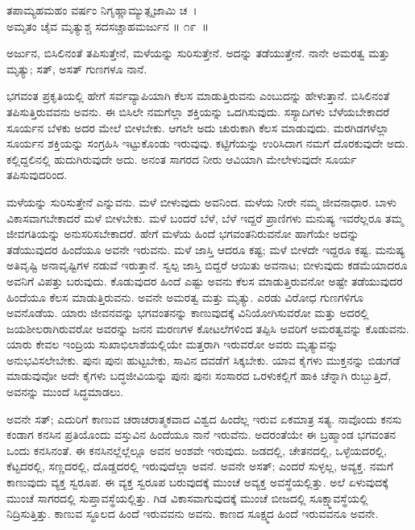 \begin{shloka}
ತಪಾಮ್ಯಹಮಹಂ ವರ್ಷಂ ನಿಗೃಹ್ಣಾಮ್ಯುತ್ಸೃಜಾಮಿ ಚ~।\\ಅಮೃತಂ ಚೈವ ಮೃತ್ಯುಶ್ಚ ಸದಸಚ್ಚಾಹಮರ್ಜುನ \hfill॥ ೧೯~॥
\end{shloka}

\begin{artha}
ಅರ್ಜುನ, ಬಿಸಿಲಿನಂತೆ ತಪಿಸುತ್ತೇನೆ, ಮಳೆಯನ್ನು ಸುರಿಸುತ್ತೇನೆ. ಅದನ್ನು ತಡೆಯುತ್ತೇನೆ. ನಾನೇ ಅಮರತ್ವ ಮತ್ತು ಮೃತ್ಯು; ಸತ್, ಅಸತ್ ಗುಣಗಳೂ ನಾನೆ.
\end{artha}

ಭಗವಂತ ಪ್ರಕೃತಿಯಲ್ಲಿ ಹೇಗೆ ಸರ್ವವ್ಯಾಪಿಯಾಗಿ ಕೆಲಸ ಮಾಡುತ್ತಿರುವನು ಎಂಬುದನ್ನು ಹೇಳುತ್ತಾನೆ. ಬಿಸಿಲಿನಂತೆ ತಪಿಸುತ್ತಿರುವವನು ಅವನು. ಈ ಬಿಸಿಲೇ ನಮಗೆಲ್ಲಾ ಶಕ್ತಿಯನ್ನು ಒದಗಿಸುವುದು. ಸಸ್ಯಾದಿಗಳು ಬೆಳೆಯಬೇಕಾದರೆ ಸೂರ್ಯನ ಬೆಳಕು ಅದರ ಮೇಲೆ ಬೀಳಬೇಕು. ಆಗಲೇ ಅದು ಚುರುಕಾಗಿ ಕೆಲಸ ಮಾಡುವುದು. ಮರಗಿಡಗಳೆಲ್ಲಾ ಸೂರ್ಯನ ಶಕ್ತಿಯನ್ನು ಸಂಗ್ರಹಿಸಿ ಇಟ್ಟುಕೊಂಡು ಇರುವುವು. ಕಟ್ಟಿಗೆಯನ್ನು ಉರಿಸಿದಾಗ ನಮಗೆ ದೊರಕುವುದೇ ಅದು. ಕಲ್ಲಿದ್ದಲಿನಲ್ಲಿ ಹುದುಗಿರುವುದೇ ಅದು. ಅನಂತ ಸಾಗರದ ನೀರು ಆವಿಯಾಗಿ ಮೇಲೇಳುವುದೇ ಸೂರ್ಯ ತಪಿಸುವುದರಿಂದ.

ಮಳೆಯನ್ನು ಸುರಿಸುತ್ತೇನೆ ಎನ್ನುವನು. ಮಳೆ ಬೀಳುವುದು ಅವನಿಂದ. ಮಳೆಯ ನೀರೇ ನಮ್ಮ ಜೀವನಾಧಾರ. ಬಾಳು ವಿಕಾಸವಾಗಬೇಕಾದರೆ ಮಳೆ ಬೀಳಬೇಕು. ಮಳೆ ಬಂದರೆ ಬೆಳೆ, ಬೆಳೆ ಇದ್ದರೆ ಪ್ರಾಣಿಗಳು ಮನುಷ್ಯ ಇವರೆಲ್ಲರೂ ತಮ್ಮ ಜೀವಗತಿಯನ್ನು ಅನುಸರಿಸಬೇಕಾದರೆ. ಹೇಗೆ ಮಳೆಯ ಹಿಂದೆ ಭಗವಂತನಿರುವನೋ ಹಾಗೆಯೇ ಅದನ್ನು ತಡೆಯುವುದರ ಹಿಂದೆಯೂ ಅವನೇ ಇರುವನು. ಮಳೆ ಜಾಸ್ತಿ ಆದರೂ ಕಷ್ಟ; ಮಳೆ ಬೀಳದೇ ಇದ್ದರೂ ಕಷ್ಟ. ಮನುಷ್ಯ ಅತಿವೃಷ್ಟಿ ಅನಾವೃಷ್ಟಿಗಳ ನಡುವೆ ಇರುತ್ತಾನೆ. ಸ್ವಲ್ಪ ಜಾಸ್ತಿ ಬಿದ್ದರೆ ಆಯಿತು ಅವನಾಟ; ಬೀಳುವುದು ಕಡಮೆಯಾದರೂ ಅವನಿಗೆ ವಿಪತ್ತು ಬರುವುದು. ಕೊಡುವುದರ ಹಿಂದೆ ಎಷ್ಟು ಅವನು ಕೆಲಸ ಮಾಡುತ್ತಿರುವನೋ ಅಷ್ಟೇ ತಡೆಯುವುದರ ಹಿಂದೆಯೂ ಕೆಲಸ ಮಾಡುತ್ತಿರುವನು. ಅವನೇ ಅಮರತ್ವ ಮತ್ತು ಮೃತ್ಯು. ಎರಡು ವಿರೋಧ ಗುಣಗಳಿಗೂ ಅವನೊಡೆಯ. ಯಾರು ಜೀವನವನ್ನು ಭಗವಂತನನ್ನು ಕಾಣುವುದಕ್ಕೆ ವಿನಿಯೋಗಿಸುವರೋ ಮತ್ತು ಅದರಲ್ಲಿ ಜಯಶೀಲರಾಗಿರು\-ವರೋ ಅವರನ್ನು ಜನನ ಮರಣಗಳ ಕೋಟಲೆಗಳಿಂದ ತಪ್ಪಿಸಿ ಅವರಿಗೆ ಅಮರತ್ವವನ್ನು ಕೊಡುವನು. ಯಾರು ಕೇವಲ ಇಂದ್ರಿಯ ಸುಖಾಭಿಲಾಶೆಯಲ್ಲಿಯೇ ಮತ್ತರಾಗಿ ಇರುವರೋ ಅವರು ಮೃತ್ಯುವನ್ನು ಅನುಭವಿಸಲೇಬೇಕು. ಪುನಃ ಪುನಃ ಹುಟ್ಟಬೇಕು, ಸಾವಿನ ದವಡೆಗೆ ಸಿಕ್ಕಬೇಕು. ಯಾವ ಕೈಗಳು ಮುಕ್ತನನ್ನು ಬಿಡುಗಡೆ ಮಾಡುವುವೋ ಅದೇ ಕೈಗಳು ಬದ್ಧಜೀವಿಯನ್ನು ಪುನಃ ಪುನಃ ಸಂಸಾರದ ಒರಳುಕಲ್ಲಿಗೆ ಹಾಕಿ ಚೆನ್ನಾಗಿ ರುಬ್ಬುತ್ತಿದೆ, ಅವನನ್ನು ಮುಂದೆ ಸಿದ್ಧಮಾಡಲು.

ಅವನೇ ಸತ್​; ಎದುರಿಗೆ ಕಾಣುವ ಚರಾಚರಾತ್ಮಕವಾದ ವಿಶ್ವದ ಹಿಂದೆಲ್ಲ ಇರುವ ಏಕಮಾತ್ರ ಸತ್ಯ. ನಾವೊಂದು ಕನಸು ಕಂಡಾಗ ಕನಸಿನ ಪ್ರತಿಯೊಂದು ವಸ್ತುವಿನ ಹಿಂದೆಯೂ ನಾನೆ ಇರುವೆನು. ಅದರಂತೆಯೇ ಈ ಬ್ರಹ್ಮಾಂಡ ಭಗವಂತನ ಒಂದು ಕನಸಿನಂತೆ. ಈ ಕನಸಿನಲ್ಲೆಲ್ಲೆಲ್ಲೂ ಅವನ ಅಂಶವೇ ಇರುವುದು. ಜಡದಲ್ಲಿ, ಚೇತನದಲ್ಲಿ, ಒಳ್ಳೆಯದರಲ್ಲಿ, ಕೆಟ್ಟದರಲ್ಲಿ, ಸಣ್ಣದರಲ್ಲಿ, ದೊಡ್ಡದರಲ್ಲಿ ಇರುವುದೆಲ್ಲಾ ಅವನೆ. ಅವನೇ ಅಸತ್​; ಎಂದರೆ ಸುಳ್ಳಲ್ಲ, ಅವ್ಯಕ್ತ. ನಮಗೆ ಕಾಣುವುದು ವ್ಯಕ್ತ ಸ್ವರೂಪ. ಈ ವ್ಯಕ್ತ ಸ್ವರೂಪ ಬರುವುದಕ್ಕೆ ಮುಂಚೆ ಅವ್ಯಕ್ತ ಅವಸ್ಥೆಯಲ್ಲಿತ್ತು. ಅಲೆ ಏಳುವುದಕ್ಕೆ ಮುಂಚೆ ಸಾಗರದಲ್ಲಿ ಸುಪ್ತಾವಸ್ಥೆಯಲ್ಲಿತ್ತು. ಗಿಡ ವಿಕಾಸವಾಗುವುದಕ್ಕೆ ಮುಂಚೆ ಬೀಜದಲ್ಲಿ ಸೂಕ್ಷ್ಮಾವಸ್ಥೆಯಲ್ಲಿ ನಿದ್ರಿಸುತ್ತಿತ್ತು. ಕಾಣುವ ಸ್ಥೂಲದ ಹಿಂದೆ ಇರುವವನು ಅವನು. ಕಾಣದ ಸೂಕ್ಷ್ಮದ ಹಿಂದೆ ಇರುವವನೂ ಅವನೇ.

